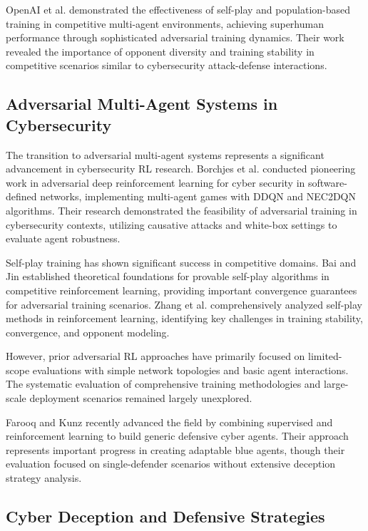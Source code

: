 \documentclass[12pt,twoside]{article}
\theoremstyle{definition}
\theoremstyle{plain}
\begin{document}
OpenAI et al. \cite{openai2019dota} demonstrated the effectiveness of self-play and population-based training in competitive multi-agent environments, achieving superhuman performance through sophisticated adversarial training dynamics. Their work revealed the importance of opponent diversity and training stability in competitive scenarios similar to cybersecurity attack-defense interactions.

\subsection{Adversarial Multi-Agent Systems in Cybersecurity}

The transition to adversarial multi-agent systems represents a significant advancement in cybersecurity RL research. Borchjes et al. \cite{borchjes2023adversarial} conducted pioneering work in adversarial deep reinforcement learning for cyber security in software-defined networks, implementing multi-agent games with DDQN and NEC2DQN algorithms. Their research demonstrated the feasibility of adversarial training in cybersecurity contexts, utilizing causative attacks and white-box settings to evaluate agent robustness.

Self-play training has shown significant success in competitive domains. Bai and Jin \cite{bai2020provable} established theoretical foundations for provable self-play algorithms in competitive reinforcement learning, providing important convergence guarantees for adversarial training scenarios. Zhang et al. \cite{zhang2024survey} comprehensively analyzed self-play methods in reinforcement learning, identifying key challenges in training stability, convergence, and opponent modeling.

However, prior adversarial RL approaches have primarily focused on limited-scope evaluations with simple network topologies and basic agent interactions. The systematic evaluation of comprehensive training methodologies and large-scale deployment scenarios remained largely unexplored.

Farooq and Kunz \cite{farooq2025combining} recently advanced the field by combining supervised and reinforcement learning to build generic defensive cyber agents. Their approach represents important progress in creating adaptable blue agents, though their evaluation focused on single-defender scenarios without extensive deception strategy analysis.

\subsection{Cyber Deception and Defensive Strategies}
\end{document}
